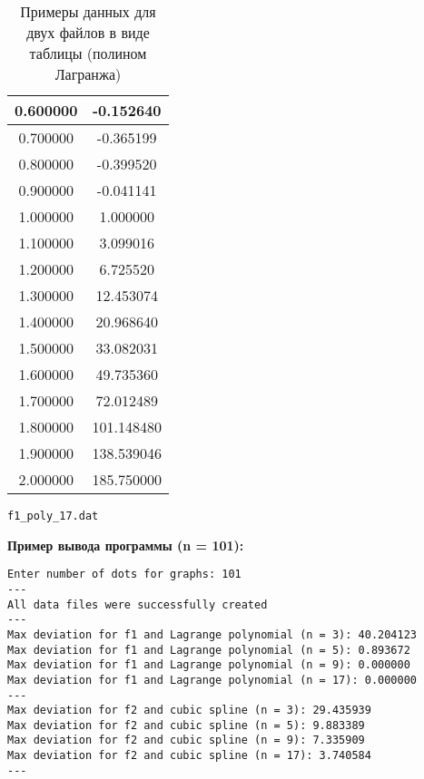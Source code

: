 \documentclass[a4paper, fleqn]{report}
\begin{document}
\begin{table}[h!]
\begin{subtable}{0.45\textwidth}
\begin{tabular}{|c|c|}
0.600000 & -0.152640 \\ \hline
0.700000 & -0.365199 \\ \hline
0.800000 & -0.399520 \\ \hline
0.900000 & -0.041141 \\ \hline
1.000000 & 1.000000 \\ \hline
1.100000 & 3.099016 \\ \hline
1.200000 & 6.725520 \\ \hline
1.300000 & 12.453074 \\ \hline
1.400000 & 20.968640 \\ \hline
1.500000 & 33.082031 \\ \hline
1.600000 & 49.735360 \\ \hline
1.700000 & 72.012489 \\ \hline
1.800000 & 101.148480 \\ \hline
1.900000 & 138.539046 \\ \hline
2.000000 & 185.750000 \\ \hline
\end{tabular}
\caption{\texttt{f1\_poly\_17.dat}}
\label{tab:table2}
\end{subtable}
\vspace{10pt}
\caption{Примеры данных для двух файлов в виде таблицы (полином Лагранжа)}
\label{tab:both_tables}
\end{table}

\vspace{10pt}

\noindent \textbf{Пример вывода программы (n = 101):}

\vspace{10pt}

\begin{verbatim}
Enter number of dots for graphs: 101
---
All data files were successfully created
---
Max deviation for f1 and Lagrange polynomial (n = 3): 40.204123
Max deviation for f1 and Lagrange polynomial (n = 5): 0.893672
Max deviation for f1 and Lagrange polynomial (n = 9): 0.000000
Max deviation for f1 and Lagrange polynomial (n = 17): 0.000000
---
Max deviation for f2 and cubic spline (n = 3): 29.435939
Max deviation for f2 and cubic spline (n = 5): 9.883389
Max deviation for f2 and cubic spline (n = 9): 7.335909
Max deviation for f2 and cubic spline (n = 17): 3.740584
---
\end{verbatim}
\end{document}
